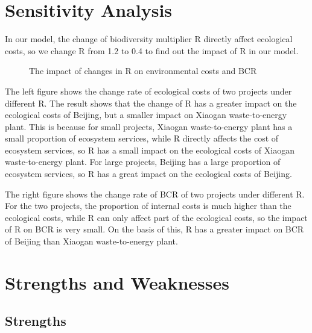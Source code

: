 \documentclass{mcmthesis}
\begin{document}
	\section{Sensitivity Analysis}	
	
		In our model, the change of biodiversity multiplier R directly affect ecological costs, so we change R from 1.2 to 0.4 to find out the impact of R in our model.
		
		\begin{figure}[htbp]
			\centering
			\centering
			\caption{The impact of changes in R on environmental costs and BCR}
		\end{figure}
		
		The left figure shows the change rate of ecological costs of two projects under different R. The result shows that the change of R has a greater impact on the ecological costs of Beijing, but a smaller impact on Xiaogan waste-to-energy plant. This is because for small projects, Xiaogan waste-to-energy plant has a small proportion of ecosystem services, while R directly affects the cost of ecosystem services, so R has a small impact on the ecological costs of Xiaogan waste-to-energy plant. For large projects, Beijing has a large proportion of ecosystem services, so R has a great impact on the ecological costs of Beijing.
		
		The right figure shows the change rate of BCR of two projects under different R. For the two projects, the proportion of internal costs is much higher than the ecological costs, while R can only affect part of the ecological costs, so the impact of R on BCR is very small. On the basis of this, R has a greater impact on BCR of Beijing than Xiaogan waste-to-energy plant.
		
	
	\section{Strengths and Weaknesses}
	
		\subsection{Strengths}
		
\end{document}

